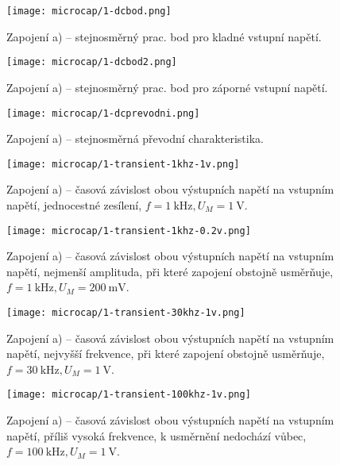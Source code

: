 \begin{figure}[h!]
    \centering
    \texttt{[image: microcap/1-dcbod.png]}
    \caption{Zapojení a) -- stejnosměrný prac. bod pro kladné vstupní napětí.}
    \label{fig:microcap/.png}
\end{figure}

\begin{figure}[h!]
    \centering
    \texttt{[image: microcap/1-dcbod2.png]}
    \caption{Zapojení a) -- stejnosměrný prac. bod pro záporné vstupní napětí.}
    \label{fig:microcap/.png}
\end{figure}

\begin{figure}[h!]
    \centering
    \texttt{[image: microcap/1-dcprevodni.png]}
    \caption{Zapojení a) -- stejnosměrná převodní charakteristika.}
    \label{fig:microcap/.png}
\end{figure}

\begin{figure}[h!]
    \centering
    \texttt{[image: microcap/1-transient-1khz-1v.png]}
    \caption{Zapojení a) -- časová závislost obou výstupních napětí na vstupním napětí, jednocestné zesílení, \(f=\qty{1}{\kilo\hertz}, U_M=\qty{1}{\volt}\).}
    \label{fig:microcap/.png}
\end{figure}

\begin{figure}[h!]
    \centering
    \texttt{[image: microcap/1-transient-1khz-0.2v.png]}
    \caption{Zapojení a) -- časová závislost obou výstupních napětí na vstupním napětí, nejmenší amplituda, při které zapojení obstojně usměrňuje, \(f=\qty{1}{\kilo\hertz}, U_M=\qty{200}{\milli\volt}\).}
    \label{fig:microcap/.png}
\end{figure}

\begin{figure}[h!]
    \centering
    \texttt{[image: microcap/1-transient-30khz-1v.png]}
    \caption{Zapojení a) -- časová závislost obou výstupních napětí na vstupním napětí, nejvyšší frekvence, při které zapojení obstojně usměrňuje, \(f=\qty{30}{\kilo\hertz}, U_M=\qty{1}{\volt}\).}
    \label{fig:microcap/.png}
\end{figure}

\begin{figure}[h!]
    \centering
    \texttt{[image: microcap/1-transient-100khz-1v.png]}
    \caption{Zapojení a) -- časová závislost obou výstupních napětí na vstupním napětí, příliš vysoká frekvence, k usměrnění nedochází vůbec, \(f=\qty{100}{\kilo\hertz}, U_M=\qty{1}{\volt}\).}
    \label{fig:microcap/.png}
\end{figure}    


